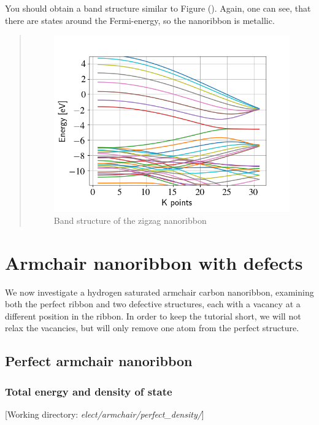 \documentclass[a4paper,11pt,english]{sphinxmanual}
\begin{document}
{{You should obtain a band structure similar to Figure
{\hyperref[electstruct:fig-zigzag-band]{\emph{}}} (). Again, one can see, that there are states around the Fermi-energy, so
the nanoribbon is metallic.
\begin{quote}
\begin{figure}[htbp]
\centering
\capstart
\includegraphics[width=0.700\linewidth]{zigzag-band.png}
\caption{Band structure of the zigzag nanoribbon}\label{electstruct:fig-zigzag-band}\end{figure}
\end{quote}

\section{Armchair nanoribbon with defects}
\label{electstruct:armchair-nanoribbon-with-defects}
We now investigate a hydrogen saturated armchair carbon nanoribbon,
examining both the perfect ribbon and two defective structures, each
with a vacancy at a different position in the ribbon. In order to keep
the tutorial short, we will not relax the vacancies, but will only
remove one atom from the perfect structure.


\subsection{Perfect armchair nanoribbon}
\label{electstruct:perfect-armchair-nanoribbon}

\subsubsection{Total energy and density of state}
\label{electstruct:total-energy-and-density-of-state}
{[}Working directory: \emph{elect/armchair/perfect\_density/}{]}

}}
\end{document}
